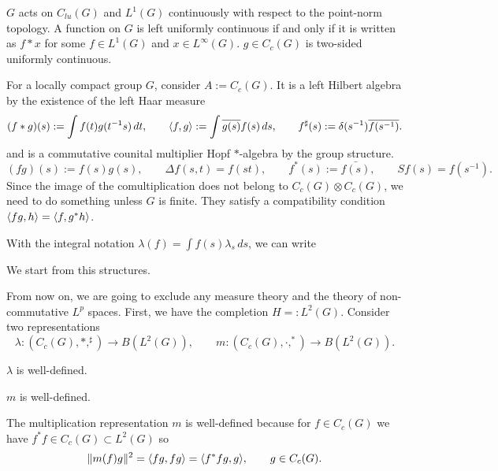 \documentclass{../../large}
\begin{document}
\begin{prb}
$G$ acts on $C_{lu}(G)$ and $L^1(G)$ continuously with respect to the point-norm topology.
A function on $G$ is left uniformly continuous if and only if it is written as $f*x$ for some $f\in L^1(G)$ and $x\in L^\infty(G)$.
$g\in C_c(G)$ is two-sided uniformly continuous.
\end{prb}



\begin{prb}
For a locally compact group $G$, consider $A:=C_c(G)$.
It is a left Hilbert algebra by the existence of the left Haar measure
\[(f*g)(s):=\int f(t)g(t^{-1}s)\,dt,\qquad\langle f,g\rangle:=\int\overline{g(s)}f(s)\,ds,\qquad f^\sharp(s):=\delta(s^{-1})\overline{f(s^{-1})}.\]
and is a commutative counital multiplier Hopf $*$-algebra by the group structure.
\[(fg)(s):=f(s)g(s),\qquad\Delta f(s,t)=f(st),\qquad f^*(s):=\bar{f(s)},\qquad Sf(s)=f(s^{-1}).\]
Since the image of the comultiplication does not belong to $C_c(G)\otimes C_c(G)$, we need to do something unless $G$ is finite.
They satisfy a compatibility condition $\langle fg,h\rangle=\langle f,g^*h\rangle$.

With the integral notation $\lambda(f)=\int f(s)\lambda_s\,ds$, we can write

We start from this structures.

From now on, we are going to exclude any measure theory and the theory of non-commutative $L^p$ spaces.
First, we have the completion $H=:L^2(G)$.
Consider two representations
\[\lambda:(C_c(G),*,^\sharp)\to B(L^2(G)),\qquad m:(C_c(G),\cdot,^*)\to B(L^2(G)).\]
\begin{parts}
\item $\lambda$ is well-defined.
\item $m$ is well-defined.
\end{parts}
\end{prb}
\begin{pf}
The multiplication representation $m$ is well-defined because for $f\in C_c(G)$ we have $f^*f\in C_c(G)\subset L^2(G)$ so
\[\|m(f)g\|^2=\langle fg,fg\rangle=\langle f^*fg,g\rangle,\qquad g\in C_c(G).\]
\end{pf}








\section{}
\end{document}
